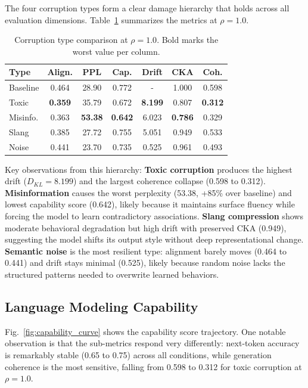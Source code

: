 \documentclass[conference]{IEEEtran}
\begin{document}
The four corruption types form a clear damage hierarchy that holds across all evaluation dimensions. Table~\ref{tab:type_comparison} summarizes the metrics at $\rho{=}1.0$.

\begin{table}[htbp]
    \centering
    \caption{Corruption type comparison at $\rho{=}1.0$. Bold marks the worst value per column.}
    \label{tab:type_comparison}
    \scriptsize
    \setlength{\tabcolsep}{3pt}
    \begin{tabular}{@{}lcccccc@{}}
        \toprule
        \textbf{Type} & \textbf{Align.} & \textbf{PPL} & \textbf{Cap.} & \textbf{Drift} & \textbf{CKA} & \textbf{Coh.} \\
        \midrule
        Baseline & 0.464 & 28.90 & 0.772 & - & 1.000 & 0.598 \\
        Toxic & \textbf{0.359} & 35.79 & 0.672 & \textbf{8.199} & 0.807 & \textbf{0.312} \\
        Misinfo. & 0.363 & \textbf{53.38} & \textbf{0.642} & 6.023 & \textbf{0.786} & 0.329 \\
        Slang & 0.385 & 27.72 & 0.755 & 5.051 & 0.949 & 0.533 \\
        Noise & 0.441 & 23.70 & 0.735 & 0.525 & 0.961 & 0.493 \\
        \bottomrule
    \end{tabular}
\end{table}

Key observations from this hierarchy: \textbf{Toxic corruption} produces the highest drift ($D_{KL} = 8.199$) and the largest coherence collapse (0.598 to 0.312). \textbf{Misinformation} causes the worst perplexity (53.38, +85\% over baseline) and lowest capability score (0.642), likely because it maintains surface fluency while forcing the model to learn contradictory associations. \textbf{Slang compression} shows moderate behavioral degradation but high drift with preserved CKA (0.949), suggesting the model shifts its output style without deep representational change. \textbf{Semantic noise} is the most resilient type: alignment barely moves (0.464 to 0.441) and drift stays minimal (0.525), likely because random noise lacks the structured patterns needed to overwrite learned behaviors.

\subsection{Language Modeling Capability}
\label{sec:capability}

Fig.~\ref{fig:capability_curve} shows the capability score trajectory. One notable observation is that the sub-metrics respond very differently: next-token accuracy is remarkably stable (0.65 to 0.75) across all conditions, while generation coherence is the most sensitive, falling from 0.598 to 0.312 for toxic corruption at $\rho{=}1.0$.
\end{document}
